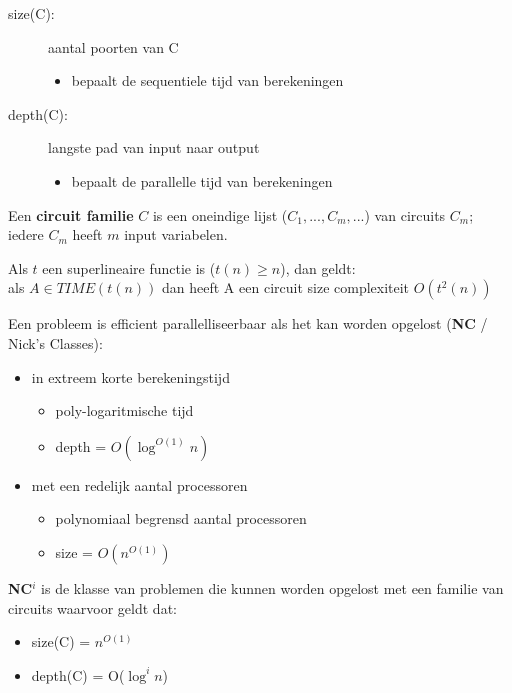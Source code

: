 \documentclass[]{article}
\begin{document}
\begin{description}
\item[size(C):] aantal poorten van C
\begin{itemize}
\item bepaalt de sequentiele tijd van berekeningen
\end{itemize}
\item[depth(C):] langste pad van input naar output
\begin{itemize}
\item bepaalt de parallelle tijd van berekeningen
\end{itemize}
\end{description}

Een \textbf{circuit familie} $C$ is een oneindige lijst ($C_1, ..., C_m, ...$) van circuits $C_m$; iedere $C_m$ heeft $m$ input variabelen.

\medskip

Als $t$ een superlineaire functie is ($t(n) \geq n$), dan geldt: \\
\hspace*{1cm} als $A \in TIME(t(n))$ dan heeft A een circuit size complexiteit $O(t^2(n))$

\medskip

Een probleem is efficient parallelliseerbaar als het kan worden opgelost (\textbf{NC} / Nick's Classes):

\begin{itemize}
\item in extreem korte berekeningstijd
\begin{itemize}
\item poly-logaritmische tijd
\item depth = $O(\log^{O(1)}n)$
\end{itemize}
\item met een redelijk aantal processoren
\begin{itemize}
\item polynomiaal begrensd aantal processoren
\item size = $O(n^{O(1)})$
\end{itemize}
\end{itemize}

\textbf{NC$^i$} is de klasse van problemen die kunnen worden opgelost met een familie van circuits waarvoor geldt dat:

\begin{itemize}
\item size(C) = $n^{O(1)}$
\item depth(C) = O($\log^i n$)
\end{itemize}
\end{document}
